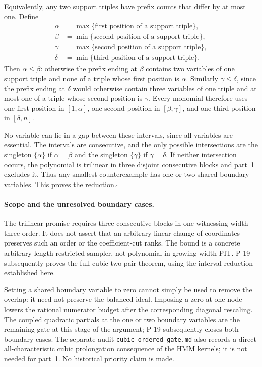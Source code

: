 Equivalently, any two support triples have prefix counts that
differ by at most one. Define
\[
 \begin{aligned}
 \alpha&=\max\{\text{first position of a support triple}\},\\
 \beta&=\min\{\text{second position of a support triple}\},\\
 \gamma&=\max\{\text{second position of a support triple}\},\\
 \delta&=\min\{\text{third position of a support triple}\}.
 \end{aligned}
 \tag{P18.7}
\]
Then $\alpha\le\beta$: otherwise the prefix ending at $\beta$
contains two variables of one support triple and none of a
triple whose first position is $\alpha$. Similarly
$\gamma\le\delta$, since the prefix ending at $\delta$
would otherwise contain three variables of one triple and
at most one of a triple whose second position is $\gamma$.
Every monomial therefore uses one first position in
$[1,\alpha]$, one second position in $[\beta,\gamma]$, and
one third position in $[\delta,n]$.

No variable can lie in a gap between these intervals, since
all variables are essential. The intervals are consecutive,
and the only possible intersections are the singleton
$\{\alpha\}$ if $\alpha=\beta$ and the singleton
$\{\gamma\}$ if $\gamma=\delta$. If neither intersection
occurs, the polynomial is trilinear in three disjoint
consecutive blocks and part~1 excludes it. Thus any smallest
counterexample has one or two shared boundary variables.
This proves the reduction.\hfill$\square$

\paragraph{Scope and the unresolved boundary cases.}
The trilinear promise requires three consecutive blocks in
one witnessing width-three order. It does not assert that an
arbitrary linear change of coordinates preserves such an order
or the coefficient-cut ranks. The bound is a concrete
arbitrary-length restricted sampler, not polynomial-in-growing-width
PIT. P-19 subsequently proves the full cubic two-pair theorem,
using the interval reduction established here.

Setting a shared boundary variable to zero cannot simply be
used to remove the overlap: it need not preserve the balanced
ideal. Imposing a zero at one node lowers the rational numerator
budget after the corresponding diagonal rescaling. The coupled
quadratic partials at the one or two boundary variables are
the remaining gate at this stage of the argument; P-19
subsequently closes both boundary cases. The separate audit
\texttt{cubic\_ordered\_gate.md} also records a direct
all-characteristic cubic prolongation consequence of the HMM
kernels; it is not needed for part~1. No historical priority
claim is made.
